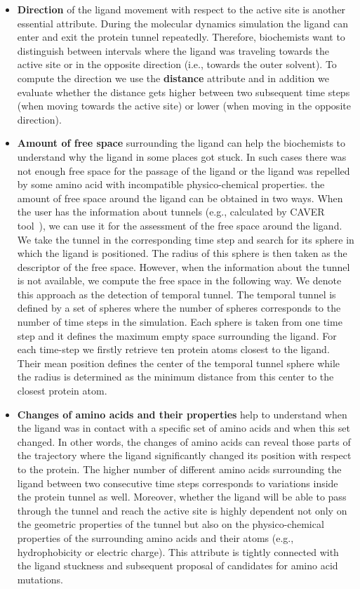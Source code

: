 \documentclass[twocolumn]{bmcart}%
\begin{document}
\begin{itemize}
\item \textbf{Direction} of the ligand movement with respect to the active site is another essential attribute. 
During the molecular dynamics simulation the ligand can enter and exit the protein tunnel repeatedly. 
Therefore, biochemists want to distinguish between intervals where the ligand was traveling towards the active site or in the opposite direction (i.e., towards the outer solvent). 
To compute the direction we use the \textbf{distance} attribute and in addition we evaluate whether the distance gets higher between two subsequent time steps (when moving towards the active site) or lower (when moving in the opposite direction). 

\item \textbf{Amount of free space} surrounding the ligand can help the biochemists to understand why the ligand in some places got stuck.
In such cases there was not enough free space for the passage of the ligand or the ligand was repelled by some amino acid with incompatible physico-chemical properties.
the amount of free space around the ligand can be obtained in two ways.
When the user has the information about tunnels (e.g., calculated by CAVER tool~\cite{Chovancova2012}), we can use it for the assessment of the free space around the ligand.
We take the tunnel in the corresponding time step and search for its sphere in which the ligand is positioned. 
The radius of this sphere is then taken as the descriptor of the free space.
However, when the information about the tunnel is not available, we compute the free space in the following way.
We denote this approach as the detection of temporal tunnel.
The temporal tunnel is defined by a set of spheres where the number of spheres corresponds to the number of time steps in the simulation.
Each sphere is taken from one time step and it defines the maximum empty space surrounding the ligand.
For each time-step we firstly retrieve ten protein atoms closest to the ligand. 
Their mean position defines the center of the temporal tunnel sphere while the radius is determined as the minimum distance from this center to the closest protein atom.

\item \textbf{Changes of amino acids and their properties} help to understand when the ligand was in contact with a specific set of amino acids and when this set changed.
In other words, the changes of amino acids can reveal those parts of the trajectory where the ligand significantly changed its position with respect to the protein. 
The higher number of different amino acids surrounding the ligand between two consecutive time steps corresponds to variations inside the protein tunnel as well.
Moreover, whether the ligand will be able to pass through the tunnel and reach the active site is highly dependent not only on the geometric properties of the tunnel but also on the physico-chemical properties of the surrounding amino acids and their atoms (e.g., hydrophobicity or electric charge).
This attribute is tightly connected with the ligand stuckness and subsequent proposal of candidates for amino acid mutations.


\end{itemize}
\end{document}
